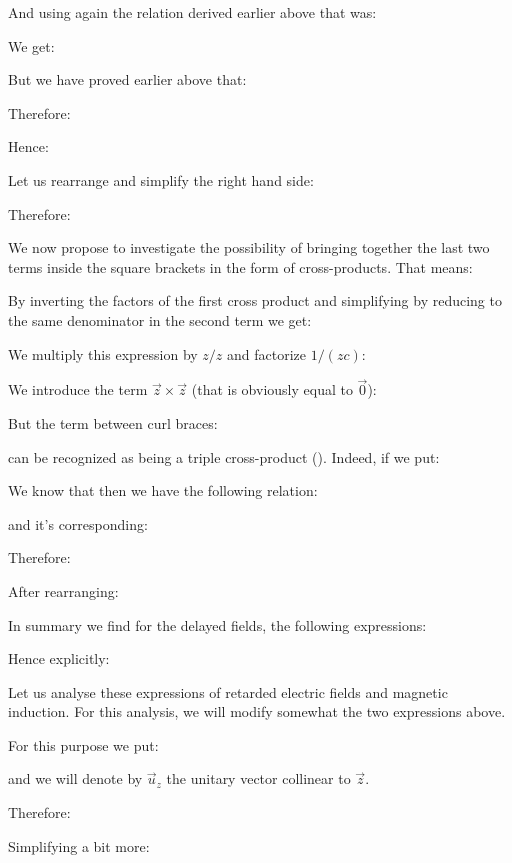 	And using again the relation derived earlier above that was:
	
	We get:
	
	But we have proved earlier above that:
	
	Therefore:
	
	Hence:
	
	Let us rearrange and simplify the right hand side:
	
	Therefore:
	
	We now propose to investigate the possibility of bringing together the last two terms inside the square brackets in the form of cross-products. That means:
	
	By inverting the factors of the first cross product and simplifying by reducing to the same denominator in the second term we get:
	
	We multiply this expression by $z/z$ and factorize $1/(zc)$:
	
	We introduce the term $\vec{z}\times\vec{z}$ (that is obviously equal to $\vec{0}$):
	
	But the term between curl braces:
	
	can be recognized as being a triple cross-product (). Indeed, if we put:
	
	We know that then we have the following relation:
	
	and it's corresponding:
	
	Therefore:
	
	After rearranging:
	
	In summary we find for the delayed fields, the following expressions:
	
	Hence explicitly:
	
	Let us analyse these expressions of retarded electric fields and magnetic induction. For this analysis, we will modify somewhat the two expressions above.
	
	For this purpose we put:
	
	and we will denote by $\vec{u}_z$ the unitary vector collinear to $\vec{z}$.
	
	Therefore:
	
	Simplifying a bit more:
	
